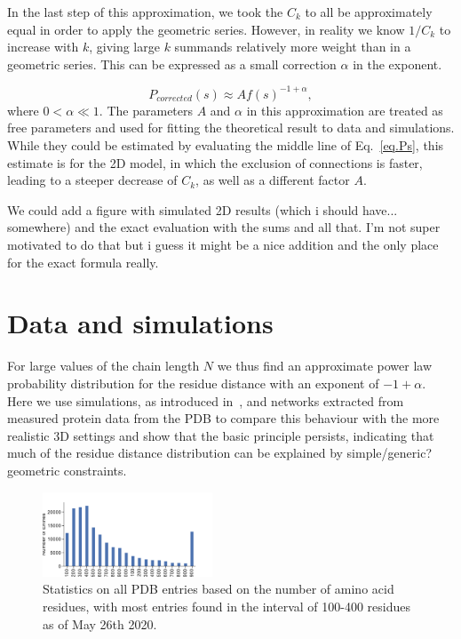 \documentclass[
reprint,
twocolumn,
amsmath,amssymb,superscriptaddress,aps,
pre]{revtex4-1}
\newcommand{\red}[1]{\textcolor{red!80!black}{#1}}
\newcommand{\blue}[1]{\textcolor{blue!80!black}{#1}}
\begin{document}
In the last step of this approximation, we took the $C_k$ to all be approximately equal in order to apply the geometric series. However, in reality we know $1/C_k$ to increase with $k$, giving large $k$ summands relatively more weight than in a geometric series. This can be expressed as a small correction $\alpha$ in the exponent.

\begin{equation}
    P_{corrected}(s)\approx A f(s)^{-1+\alpha},
\end{equation}
where $0<\alpha \ll 1$. \blue{The parameters $A$ and $\alpha$ in this approximation are treated as free parameters and used for fitting the theoretical result to data and simulations. While they could be estimated by evaluating the middle line of Eq.~\ref{eq.Ps}, this estimate is for the 2D model, in which the exclusion of connections is faster, leading to a steeper decrease of $C_k$, as well as a different factor $A$.}

\red{We could add a figure with simulated 2D results (which i should have... somewhere) and the exact evaluation with the sums and all that. I'm not super motivated to do that but i guess it might be a nice addition and the only place for the exact formula really.}

\section*{Data and simulations}
For large values of the chain length $N$ we thus find an approximate power law probability distribution for the residue distance with an exponent of $-1+\alpha$. Here we use simulations, as introduced in~\cite{molkenthin2020self}, and networks extracted from measured protein data from the PDB \cite{PDB} to compare this behaviour \blue{with the more} realistic 3D settings and show that the basic principle persists, indicating that much of the residue distance distribution can be explained by simple\blue{/generic?} geometric constraints.
 \begin{figure}[h]
        \centering
    \includegraphics[width=0.45\textwidth]{paper/figures/Fig2/pdb_statistics.pdf}
        \caption{Statistics on all PDB entries based on the number of amino acid residues, with most entries found in the interval of 100-400 residues as of May 26th 2020.}
        \label{fig:pdb_stats}
\end{figure}
\end{document}
